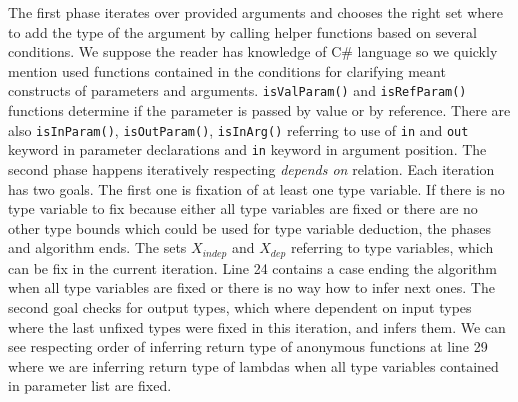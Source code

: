 The first phase iterates over provided arguments and chooses the right set where to add the type of the argument by calling helper functions based on several conditions.
We suppose the reader has knowledge of C\# language so we quickly mention used functions contained in the conditions for clarifying meant constructs of parameters and arguments.
\texttt{isValParam()} and \texttt{isRefParam()} functions determine if the parameter is passed by value or by reference.
There are also \texttt{isInParam()}, \texttt{isOutParam()}, \texttt{isInArg()} referring to use of \texttt{in} and \texttt{out} keyword in parameter declarations and \texttt{in} keyword in argument position.
The second phase happens iteratively respecting \textit{depends on} relation.
Each iteration has two goals.
The first one is fixation of at least one type variable.
If there is no type variable to fix because either all type variables are fixed or there are no other type bounds which could be used for type variable deduction, the phases and algorithm ends.
The sets \texttt{$X_{indep}$} and \texttt{$X_{dep}$} referring to type variables, which can be fix in the current iteration.
Line 24 contains a case ending the algorithm when all type variables are fixed or there is no way how to infer next ones.
The second goal checks for output types, which where dependent on input types where the last unfixed types were fixed in this iteration, and infers them.
We can see respecting order of inferring return type of anonymous functions at line 29 where we are inferring return type of lambdas when all type variables contained in parameter list are fixed.
\par
